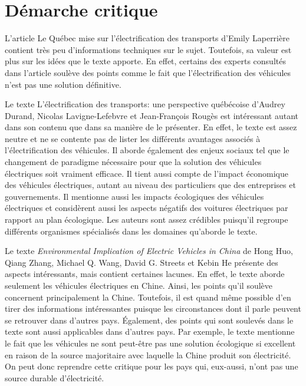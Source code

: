 
\chapter{Démarche critique}

L'article \og{} Le Québec mise sur l’électrification des transports\fg{} d'Emily Laperrière contient très peu d'informations techniques sur le sujet. Toutefois, sa valeur est plus sur les idées que le texte apporte. En effet, certains des experts consultés dans l'article soulève des points comme le fait que l'électrification des véhicules n'est pas une solution définitive. 

Le texte \og{} L’électrification des transports: une perspective québécoise\fg{} d'Audrey Durand, Nicolas Lavigne-Lefebvre et Jean-François Rougès est intéressant autant dans son contenu que dans sa manière de le présenter. En effet, le texte est assez neutre et ne se contente pas de lister les différents avantages associés à l'électrification des véhicules. Il aborde également des enjeux sociaux tel que le changement de paradigme nécessaire pour que la solution des véhicules électriques soit vraiment efficace. Il tient aussi compte de l'impact économique des véhicules électriques, autant au niveau des particuliers que des entreprises et gouvernements. Il mentionne aussi les impacts écologiques des véhicules électriques et considèrent aussi les aspects négatifs des voitures électriques par rapport au plan écologique. Les auteurs sont assez crédibles puisqu'il regroupe différents organismes spécialisés dans les domaines qu'aborde le texte.

Le texte \og\emph{Environmental Implication of Electric Vehicles in China}\fg{} de Hong Huo, Qiang Zhang, Michael Q. Wang, David G. Streets et Kebin He présente des aspects intéressants, mais contient certaines lacunes. En effet, le texte aborde seulement les véhicules électriques en Chine. Ainsi, les points qu'il soulève concernent principalement la Chine. Toutefois, il est quand même possible d'en tirer des informations intéressantes puisque les circonstances dont il parle peuvent se retrouver dans d'autres pays. Également, des points qui sont soulevés dans le texte sont aussi applicables dans d'autres pays. Par exemple, le texte mentionne le fait que les véhicules ne sont peut-être pas une solution écologique si excellent en raison de la source majoritaire avec laquelle la Chine produit son électricité. On peut donc reprendre cette critique pour les pays qui, eux-aussi, n'ont pas une source durable d'électricité.
